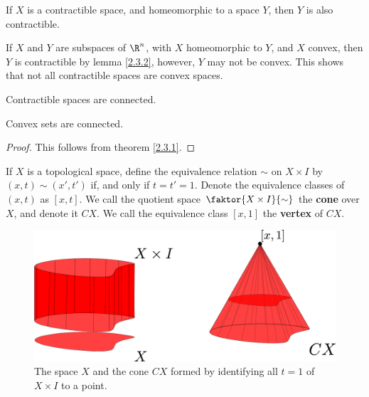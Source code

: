 \begin{lemma}\label{2.3.2}
    If $X$ is a contractible space, and homeomorphic to a space  $Y$, then  $Y$
    is also contractible.
\end{lemma}

\begin{example}\label{3.6}
    If $X$ and  $Y$ are subspaces of  $\R^n$, with $X$ homeomorphic to $Y$, and
     $X$ convex, then  $Y$ is contractible by lemma \ref{2.3.2}, however, $Y$
     may not be convex. This shows that not all contractible spaces are convex
     spaces.
\end{example}

\begin{lemma}\label{2.3.3}
    Contractible spaces are connected.
\end{lemma}
\begin{corollary}
    Convex sets are connected.
\end{corollary}
\begin{proof}
    This follows from theorem \ref{2.3.1}.
\end{proof}

\begin{definition}
    If $X$ is a topological space, define the equivalence relation  $\sim$ on
    $X \times I$ by  $(x,t) \sim (x',t')$ if, and only if $t=t'=1$. Denote the
    equivalence classes of  $(x,t)$ as $[x,t]$. We call the quotient space
    $\faktor{X \times I}{\sim}$ the \textbf{cone} over $X$, and denote it  $CX$.
    We call the equivalence class  $[x,1]$ the \textbf{vertex} of $CX$.
\end{definition}

\begin{figure}[h]
    \centering
    \includegraphics[scale=0.2]{Figures/chapter3/cone.eps}
    \caption{The space $X$ and the cone $CX$ formed by identifying all $t=1$ of
    $X \times I$ to a point.}
    \label{fig_3.1}
\end{figure}

